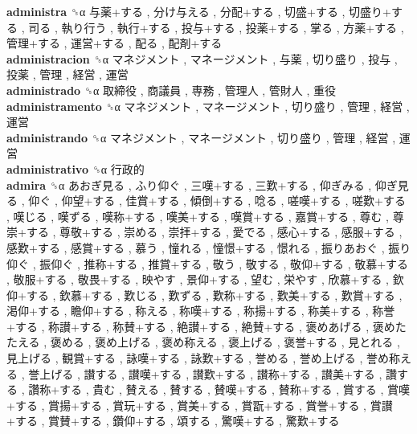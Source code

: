 \textbf{administra} ␝α   与薬+する ,  分け与える ,  分配+する ,  切盛+する ,  切盛り+する ,  司る ,  執り行う ,  執行+する ,  投与+する ,  投薬+する ,  掌る ,  方薬+する ,  管理+する ,  運営+する ,  配る ,  配剤+する   \\
\textbf{administracion} ␝α   マネジメント ,  マネージメント ,  与薬 ,  切り盛り ,  投与 ,  投薬 ,  管理 ,  経営 ,  運営   \\
\textbf{administrado} ␝α   取締役 ,  商議員 ,  専務 ,  管理人 ,  管財人 ,  重役   \\
\textbf{administramento} ␝α   マネジメント ,  マネージメント ,  切り盛り ,  管理 ,  経営 ,  運営   \\
\textbf{administrando} ␝α   マネジメント ,  マネージメント ,  切り盛り ,  管理 ,  経営 ,  運営   \\
\textbf{administrativo} ␝α   行政的   \\
\textbf{admira} ␝α   あおぎ見る ,  ふり仰ぐ ,  三嘆+する ,  三歎+する ,  仰ぎみる ,  仰ぎ見る ,  仰ぐ ,  仰望+する ,  佳賞+する ,  傾倒+する ,  唸る ,  嗟嘆+する ,  嗟歎+する ,  嘆じる ,  嘆ずる ,  嘆称+する ,  嘆美+する ,  嘆賞+する ,  嘉賞+する ,  尊む ,  尊崇+する ,  尊敬+する ,  崇める ,  崇拝+する ,  愛でる ,  感心+する ,  感服+する ,  感歎+する ,  感賞+する ,  慕う ,  憧れる ,  憧憬+する ,  憬れる ,  振りあおぐ ,  振り仰ぐ ,  振仰ぐ ,  推称+する ,  推賞+する ,  敬う ,  敬する ,  敬仰+する ,  敬慕+する ,  敬服+する ,  敬畏+する ,  映やす ,  景仰+する ,  望む ,  栄やす ,  欣慕+する ,  欽仰+する ,  欽慕+する ,  歎じる ,  歎ずる ,  歎称+する ,  歎美+する ,  歎賞+する ,  渇仰+する ,  瞻仰+する ,  称える ,  称嘆+する ,  称揚+する ,  称美+する ,  称誉+する ,  称讃+する ,  称賛+する ,  絶讃+する ,  絶賛+する ,  褒めあげる ,  褒めたたえる ,  褒める ,  褒め上げる ,  褒め称える ,  褒上げる ,  褒誉+する ,  見とれる ,  見上げる ,  観賞+する ,  詠嘆+する ,  詠歎+する ,  誉める ,  誉め上げる ,  誉め称える ,  誉上げる ,  讃する ,  讃嘆+する ,  讃歎+する ,  讃称+する ,  讃美+する ,  讚する ,  讚称+する ,  貴む ,  賛える ,  賛する ,  賛嘆+する ,  賛称+する ,  賞する ,  賞嘆+する ,  賞揚+する ,  賞玩+する ,  賞美+する ,  賞翫+する ,  賞誉+する ,  賞讃+する ,  賞賛+する ,  鑽仰+する ,  頌する ,  驚嘆+する ,  驚歎+する   \\
